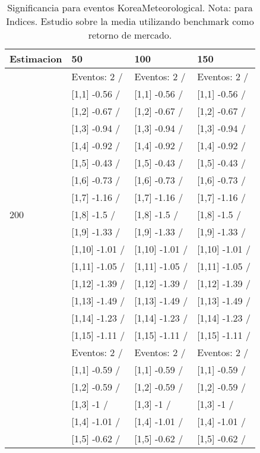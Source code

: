 \begin{table}

\caption{Significancia para eventos KoreaMeteorological. Nota: para Indices. Estudio sobre la media utilizando benchmark como retorno de mercado.}
\centering
\begin{tabular}[t]{llll}
\toprule
Estimacion & 50 & 100 & 150\\
\midrule
 & Eventos:  2 / & Eventos:  2 / & Eventos:  2 /\\
 & {}[1,1] -0.56  / & {}[1,1] -0.56  / & {}[1,1] -0.56  /\\
 & {}[1,2] -0.67  / & {}[1,2] -0.67  / & {}[1,2] -0.67  /\\
 & {}[1,3] -0.94  / & {}[1,3] -0.94  / & {}[1,3] -0.94  /\\
 & {}[1,4] -0.92  / & {}[1,4] -0.92  / & {}[1,4] -0.92  /\\
\addlinespace
 & {}[1,5] -0.43  / & {}[1,5] -0.43  / & {}[1,5] -0.43  /\\
 & {}[1,6] -0.73  / & {}[1,6] -0.73  / & {}[1,6] -0.73  /\\
 & {}[1,7] -1.16  / & {}[1,7] -1.16  / & {}[1,7] -1.16  /\\
200 & {}[1,8] -1.5  / & {}[1,8] -1.5  / & {}[1,8] -1.5  /\\
 & {}[1,9] -1.33  / & {}[1,9] -1.33  / & {}[1,9] -1.33  /\\
\addlinespace
 & {}[1,10] -1.01  / & {}[1,10] -1.01  / & {}[1,10] -1.01  /\\
 & {}[1,11] -1.05  / & {}[1,11] -1.05  / & {}[1,11] -1.05  /\\
 & {}[1,12] -1.39  / & {}[1,12] -1.39  / & {}[1,12] -1.39  /\\
 & {}[1,13] -1.49  / & {}[1,13] -1.49  / & {}[1,13] -1.49  /\\
 & {}[1,14] -1.23  / & {}[1,14] -1.23  / & {}[1,14] -1.23  /\\
\addlinespace
 & {}[1,15] -1.11  / & {}[1,15] -1.11  / & {}[1,15] -1.11  /\\
 & Eventos:  2 / & Eventos:  2 / & Eventos:  2 /\\
 & {}[1,1] -0.59  / & {}[1,1] -0.59  / & {}[1,1] -0.59  /\\
 & {}[1,2] -0.59  / & {}[1,2] -0.59  / & {}[1,2] -0.59  /\\
 & {}[1,3] -1  / & {}[1,3] -1  / & {}[1,3] -1  /\\
\addlinespace
 & {}[1,4] -1.01  / & {}[1,4] -1.01  / & {}[1,4] -1.01  /\\
 & {}[1,5] -0.62  / & {}[1,5] -0.62  / & {}[1,5] -0.62  /\\

\end{tabular}
\end{table}
